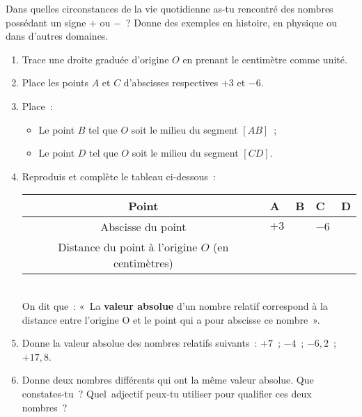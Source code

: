 \begin{activite}
\begin{partie}
Dans quelles circonstances de la vie quotidienne as-tu rencontré des nombres possédant un signe $+$ ou $-$ ? Donne des exemples en histoire, en physique ou dans d'autres domaines. 
\end{partie}

\end{activite}


\begin{activite}[Opposés ?]

\begin{enumerate}
 \item Trace une droite graduée d'origine $O$ en prenant le centimètre comme unité.
 \item Place les points $A$ et $C$ d'abscisses respectives $+ 3$ et $- 6$.
 \item Place :
 \begin{itemize}
  \item Le point $B$ tel que $O$ soit le milieu du segment $[AB]$ ;
  \item Le point $D$ tel que $O$ soit le milieu du segment $[CD]$.
  \end{itemize}
 \item Reproduis et complète le tableau ci-dessous : \\[1em]
  \begin{tabularx}{\linewidth}{|c|X|X|X|X|}
   \hline
   \rowcolor{J2} Point & A & B & C & D \\\hline
   \rowcolor{J2} Abscisse du point & $+ 3$ & & $- 6$ & \\\hline
   \rowcolor{J2} Distance du point à l'origine $O$ (en centimètres) & & & & \\\hline
   \end{tabularx} \\[1em]
  On dit que : « La \textbf{valeur absolue} d'un nombre relatif correspond à la distance entre l'origine O et le point qui a pour abscisse ce nombre ». 

 \item Donne la valeur absolue des nombres relatifs suivants : $+ 7$ ; $- 4$ ; $- 6,2$ ; $+ 17,8$.
 \item Donne deux nombres différents qui ont la même valeur absolue. Que constates-tu ? Quel adjectif peux-tu utiliser pour qualifier ces deux nombres ?
 \end{enumerate}
 
\end{activite}

